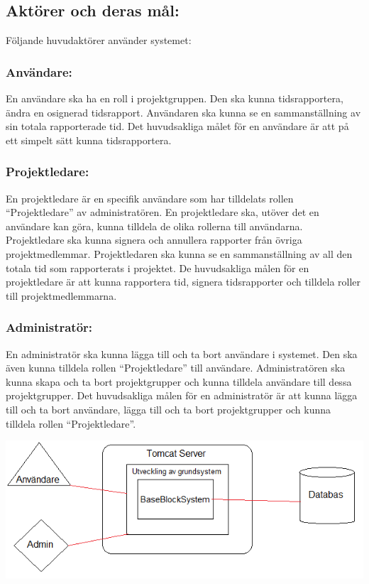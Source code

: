 \documentclass[paper=a4, fontsize=11pt,twoside]{article}
\begin{document}
	\subsection{Aktörer och deras mål:}
	Följande huvudaktörer använder systemet:
	\subsubsection{Användare:}
	En användare ska ha en roll i projektgruppen. Den ska kunna tidsrapportera, ändra en osignerad tidsrapport. Användaren ska kunna se en sammanställning av sin totala rapporterade tid. Det huvudsakliga målet för en användare är att på ett simpelt sätt kunna tidsrapportera.
	\subsubsection{Projektledare:}
	En projektledare är en specifik användare som har tilldelats rollen “Projektledare” av administratören. En projektledare ska, utöver det en användare kan göra, kunna tilldela de olika rollerna till användarna. Projektledare ska kunna signera och annullera rapporter från övriga projektmedlemmar. Projektledaren ska kunna se en sammanställning av all den totala tid som rapporterats i projektet. De huvudsakliga målen för en projektledare är att kunna rapportera tid, signera tidsrapporter och tilldela roller till projektmedlemmarna. 
	\subsubsection{Administratör:}
	En administratör ska kunna lägga till och ta bort användare i systemet. Den ska även kunna tilldela rollen “Projektledare” till användare. Administratören ska kunna skapa och ta bort projektgrupper och kunna tilldela användare till dessa projektgrupper. Det huvudsakliga målen för en administratör är att kunna lägga till och ta bort användare, lägga till och ta bort projektgrupper och kunna tilldela rollen “Projektledare”.
	
	\includegraphics{kontextdiagram_SRS.png}
	
\end{document}
